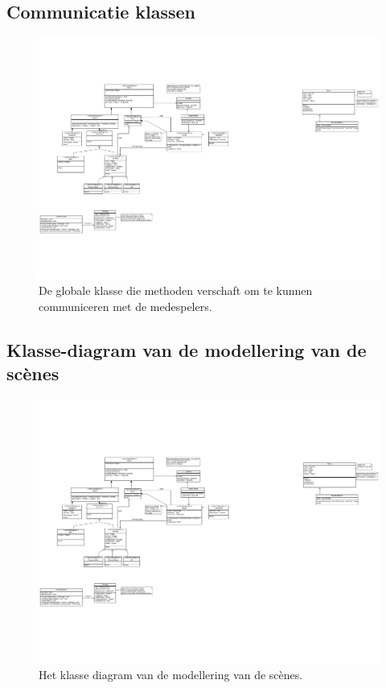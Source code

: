 \documentclass[a4paper,11pt]{article}
\begin{document}
    \subsection{Communicatie klassen}
    \begin{figure}[h]
        \centering
    	\includegraphics{../Class-diagram/NetCommunication.pdf}
	\caption{De globale klasse die methoden verschaft om te kunnen communiceren met de medespelers.}
    \end{figure}
    \label{app:Comm}
    \FloatBarrier
    \newpage
    \subsection{Klasse-diagram van de modellering van de sc\`enes}
    \begin{figure}[h]
        \centering
    	\includegraphics{../Class-diagram/SceneModel.pdf}
	\caption{Het klasse diagram van de modellering van de sc\`enes.}
    \end{figure}
    \label{app:Scene}
    \FloatBarrier
    \newpage
\end{document}
